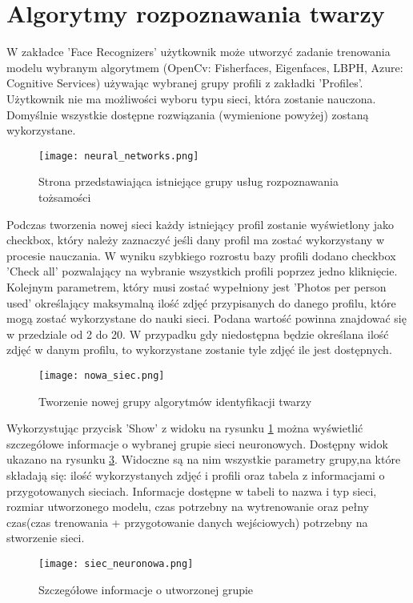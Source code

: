 \section{Algorytmy rozpoznawania twarzy}
W zakładce 'Face Recognizers' użytkownik może utworzyć zadanie trenowania modelu wybranym algorytmem (OpenCv: Fisherfaces, Eigenfaces, LBPH, Azure: Cognitive Services) używając wybranej grupy profili z zakładki 'Profiles'. Użytkownik nie ma możliwości wyboru typu sieci, która zostanie nauczona. Domyślnie wszystkie dostępne rozwiązania (wymienione powyżej) zostaną wykorzystane.
\begin{figure}[H]
	\centering
	\texttt{[image: neural\_networks.png]}
	\caption{Strona przedstawiająca istniejące grupy usług rozpoznawania tożsamości}
	\label{fig:sieci_neuronowe}
\end{figure}
Podczas tworzenia nowej sieci każdy istniejący profil zostanie wyświetlony jako checkbox, który należy zaznaczyć jeśli dany profil ma zostać wykorzystany w procesie nauczania. W wyniku szybkiego rozrostu bazy profili dodano checkbox 'Check all' pozwalający na wybranie wszystkich profili poprzez jedno kliknięcie. Kolejnym parametrem, który musi zostać wypełniony jest 'Photos per person used' określający maksymalną ilość zdjęć przypisanych do danego profilu, które mogą zostać wykorzystane do nauki sieci. Podana wartość powinna znajdować się w przedziale od 2 do 20. W przypadku gdy niedostępna będzie określana ilość zdjęć w danym profilu, to wykorzystane zostanie tyle zdjęć ile jest dostępnych.
\begin{figure}[H]
	\centering
	\texttt{[image: nowa\_siec.png]}
	\caption{Tworzenie nowej grupy algorytmów identyfikacji twarzy}
	\label{fig:nowa_siec}
\end{figure}
Wykorzystując przycisk 'Show' z widoku na rysunku \ref{fig:sieci_neuronowe} można wyświetlić szczegółowe informacje o wybranej grupie sieci neuronowych. Dostępny widok ukazano na rysunku \ref{fig:siec_neuronowa}. Widoczne są na nim wszystkie parametry grupy,na które składają się: ilość wykorzystanych zdjęć i profili oraz tabela z informacjami o przygotowanych sieciach. Informacje dostępne w tabeli to nazwa i typ sieci, rozmiar utworzonego modelu, czas potrzebny na wytrenowanie oraz pełny czas(czas trenowania + przygotowanie danych wejściowych) potrzebny na stworzenie sieci.
\begin{figure}[H]
	\centering
	\texttt{[image: siec\_neuronowa.png]}
	\caption{Szczegółowe informacje o utworzonej grupie}
	\label{fig:siec_neuronowa}
\end{figure}

